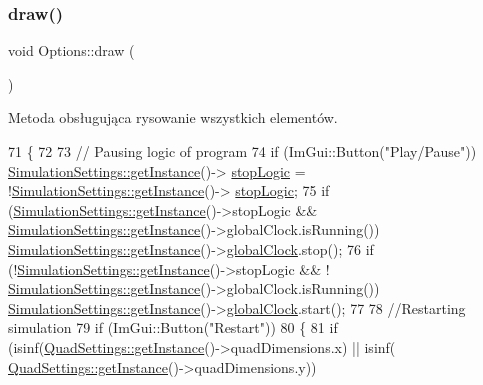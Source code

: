 \subsubsection{\texorpdfstring{draw()}{draw()}}
{\footnotesize\ttfamily void Options\+::draw (\begin{DoxyParamCaption}{ }\end{DoxyParamCaption})}

Metoda obsługująca rysowanie wszystkich elementów. 
\begin{DoxyCode}
71 \{
72 
73     \textcolor{comment}{// Pausing logic of program}
74     \textcolor{keywordflow}{if} (ImGui::Button(\textcolor{stringliteral}{"Play/Pause"})) \mbox{\hyperlink{class_simulation_settings_ab69bcd8bb611656b17d1f655d09a3004}{SimulationSettings::getInstance}}()->
      \mbox{\hyperlink{class_simulation_settings_a5196bd793ff7383a45fe9d4041cc0e97}{stopLogic}} = !\mbox{\hyperlink{class_simulation_settings_ab69bcd8bb611656b17d1f655d09a3004}{SimulationSettings::getInstance}}()->
      \mbox{\hyperlink{class_simulation_settings_a5196bd793ff7383a45fe9d4041cc0e97}{stopLogic}};
75     \textcolor{keywordflow}{if} (\mbox{\hyperlink{class_simulation_settings_ab69bcd8bb611656b17d1f655d09a3004}{SimulationSettings::getInstance}}()->stopLogic && 
      \mbox{\hyperlink{class_simulation_settings_ab69bcd8bb611656b17d1f655d09a3004}{SimulationSettings::getInstance}}()->globalClock.isRunning()) 
      \mbox{\hyperlink{class_simulation_settings_ab69bcd8bb611656b17d1f655d09a3004}{SimulationSettings::getInstance}}()->\mbox{\hyperlink{class_simulation_settings_acc1792d778ba9cd1d88d5e86a23373fb}{globalClock}}.stop();
76     \textcolor{keywordflow}{if} (!\mbox{\hyperlink{class_simulation_settings_ab69bcd8bb611656b17d1f655d09a3004}{SimulationSettings::getInstance}}()->stopLogic && !
      \mbox{\hyperlink{class_simulation_settings_ab69bcd8bb611656b17d1f655d09a3004}{SimulationSettings::getInstance}}()->globalClock.isRunning()) 
      \mbox{\hyperlink{class_simulation_settings_ab69bcd8bb611656b17d1f655d09a3004}{SimulationSettings::getInstance}}()->\mbox{\hyperlink{class_simulation_settings_acc1792d778ba9cd1d88d5e86a23373fb}{globalClock}}.start();
77 
78     \textcolor{comment}{//Restarting simulation}
79     \textcolor{keywordflow}{if} (ImGui::Button(\textcolor{stringliteral}{"Restart"}))
80     \{
81         \textcolor{keywordflow}{if} (isinf(\mbox{\hyperlink{class_quad_settings_a20d7cfd0c56c11adcdf75c5e3011de67}{QuadSettings::getInstance}}()->quadDimensions.x) || isinf(
      \mbox{\hyperlink{class_quad_settings_a20d7cfd0c56c11adcdf75c5e3011de67}{QuadSettings::getInstance}}()->quadDimensions.y)) 

\end{DoxyCode}
